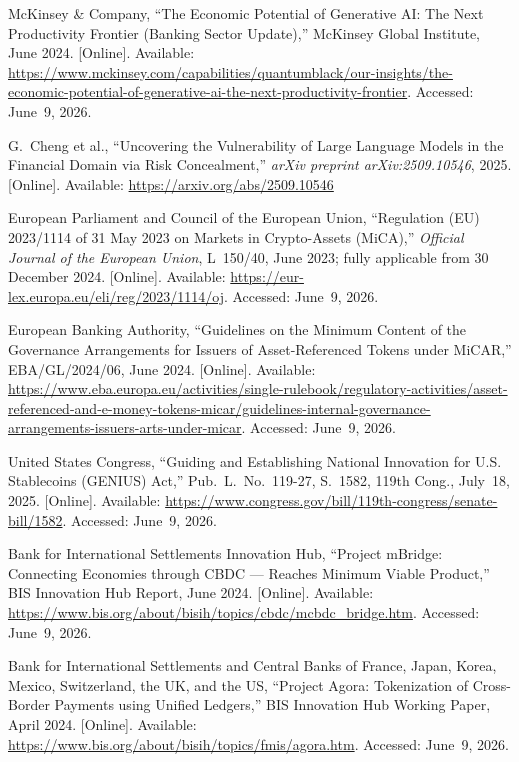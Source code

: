 \documentclass[12pt, a4paper]{report}
\begin{document}
{\begin{enumerate}[label={[\arabic*]}]
\item McKinsey \& Company, ``The Economic Potential of Generative AI: The Next Productivity Frontier (Banking Sector Update),'' McKinsey Global Institute, June 2024. [Online]. Available: \url{https://www.mckinsey.com/capabilities/quantumblack/our-insights/the-economic-potential-of-generative-ai-the-next-productivity-frontier}. Accessed: June~9, 2026.

\item G.~Cheng et al., ``Uncovering the Vulnerability of Large Language Models in the Financial Domain via Risk Concealment,'' \textit{arXiv preprint arXiv:2509.10546}, 2025. [Online]. Available: \url{https://arxiv.org/abs/2509.10546}

\item European Parliament and Council of the European Union, ``Regulation (EU) 2023/1114 of 31 May 2023 on Markets in Crypto-Assets (MiCA),'' \textit{Official Journal of the European Union}, L~150/40, June 2023; fully applicable from 30 December 2024. [Online]. Available: \url{https://eur-lex.europa.eu/eli/reg/2023/1114/oj}. Accessed: June~9, 2026.

\item European Banking Authority, ``Guidelines on the Minimum Content of the Governance Arrangements for Issuers of Asset-Referenced Tokens under MiCAR,'' EBA/GL/2024/06, June 2024. [Online]. Available: \url{https://www.eba.europa.eu/activities/single-rulebook/regulatory-activities/asset-referenced-and-e-money-tokens-micar/guidelines-internal-governance-arrangements-issuers-arts-under-micar}. Accessed: June~9, 2026.

\item United States Congress, ``Guiding and Establishing National Innovation for U.S. Stablecoins (GENIUS) Act,'' Pub.~L.~No.~119-27, S.~1582, 119th Cong., July~18, 2025. [Online]. Available: \url{https://www.congress.gov/bill/119th-congress/senate-bill/1582}. Accessed: June~9, 2026.

\item Bank for International Settlements Innovation Hub, ``Project mBridge: Connecting Economies through CBDC --- Reaches Minimum Viable Product,'' BIS Innovation Hub Report, June 2024. [Online]. Available: \url{https://www.bis.org/about/bisih/topics/cbdc/mcbdc_bridge.htm}. Accessed: June~9, 2026.

\item Bank for International Settlements and Central Banks of France, Japan, Korea, Mexico, Switzerland, the UK, and the US, ``Project Agora: Tokenization of Cross-Border Payments using Unified Ledgers,'' BIS Innovation Hub Working Paper, April 2024. [Online]. Available: \url{https://www.bis.org/about/bisih/topics/fmis/agora.htm}. Accessed: June~9, 2026.


\end{enumerate}}
\end{document}
